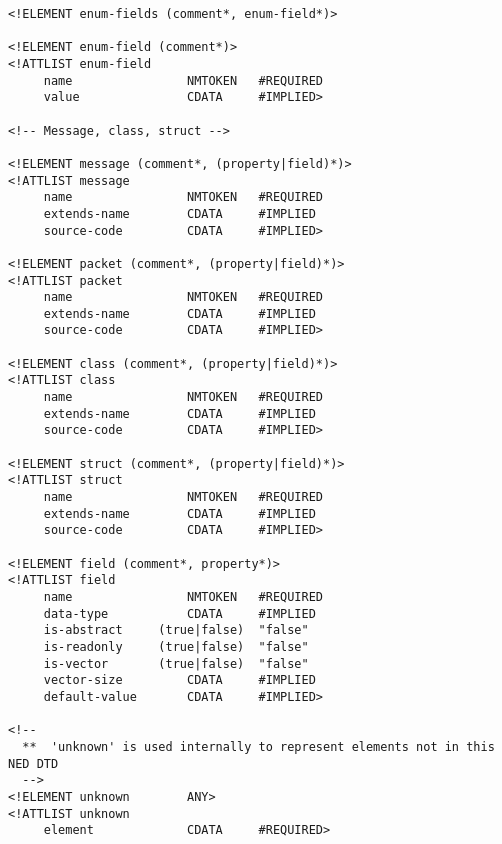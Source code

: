 \begin{verbatim}
<!ELEMENT enum-fields (comment*, enum-field*)>

<!ELEMENT enum-field (comment*)>
<!ATTLIST enum-field
     name                NMTOKEN   #REQUIRED
     value               CDATA     #IMPLIED>

<!-- Message, class, struct -->

<!ELEMENT message (comment*, (property|field)*)>
<!ATTLIST message
     name                NMTOKEN   #REQUIRED
     extends-name        CDATA     #IMPLIED
     source-code         CDATA     #IMPLIED>

<!ELEMENT packet (comment*, (property|field)*)>
<!ATTLIST packet
     name                NMTOKEN   #REQUIRED
     extends-name        CDATA     #IMPLIED
     source-code         CDATA     #IMPLIED>

<!ELEMENT class (comment*, (property|field)*)>
<!ATTLIST class
     name                NMTOKEN   #REQUIRED
     extends-name        CDATA     #IMPLIED
     source-code         CDATA     #IMPLIED>

<!ELEMENT struct (comment*, (property|field)*)>
<!ATTLIST struct
     name                NMTOKEN   #REQUIRED
     extends-name        CDATA     #IMPLIED
     source-code         CDATA     #IMPLIED>

<!ELEMENT field (comment*, property*)>
<!ATTLIST field
     name                NMTOKEN   #REQUIRED
     data-type           CDATA     #IMPLIED
     is-abstract     (true|false)  "false"
     is-readonly     (true|false)  "false"
     is-vector       (true|false)  "false"
     vector-size         CDATA     #IMPLIED
     default-value       CDATA     #IMPLIED>

<!--
  **  'unknown' is used internally to represent elements not in this NED DTD
  -->
<!ELEMENT unknown        ANY>
<!ATTLIST unknown
     element             CDATA     #REQUIRED>
\end{verbatim}


